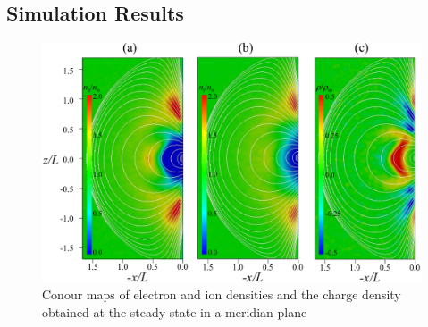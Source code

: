 \documentclass[draft,jgrga]{agutex2015}
\begin{document}
\begin{article}
\section{Simulation Results}

\begin{figure}[t]
\centering
\noindent\includegraphics[width=15cm]{./figures/Fig_2_bb-crop.pdf}
\caption{Conour maps of electron and ion densities and the charge density 
obtained at the steady state in a meridian plane}\label{fig:2}
\end{figure}


\end{article}
\end{document}
